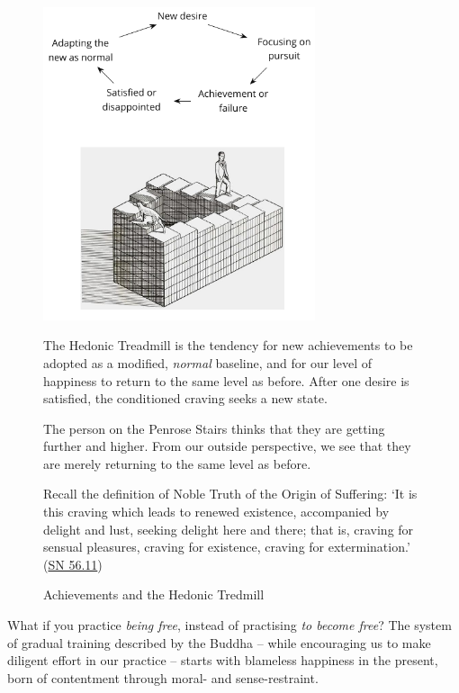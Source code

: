 \begin{figure}[h]
\caption{Achievements and the Hedonic Tredmill}\label{fig-hedonic-treadmill}

\centering

\includegraphics[width=80mm]{./manuscript/tex/diagrams/hedonic-treadmill-stairs.pdf}

\bigskip

{\small

The Hedonic Treadmill is the tendency for new achievements to be adopted as a modified, \emph{normal} baseline,
and for our level of happiness to return to the same level as before.
After one desire is satisfied, the conditioned craving seeks a new state.

\bigskip

The person on the Penrose Stairs thinks that
they are getting further and higher.
From our outside perspective,
we see that they are merely returning to the same level as before.

\bigskip

Recall the definition of Noble Truth of the Origin of Suffering:
`It is this craving which leads to renewed existence,
 accompanied by delight and lust, seeking delight here and there;
 that is, craving for sensual pleasures, craving for existence,
 craving for extermination.'
(\href{https://suttacentral.net/sn56.11/en/bodhi}{SN 56.11})

}

\end{figure}

\clearpage

What if you practice \emph{being free}, instead of practising \emph{to
become free}? The system of gradual training described by the Buddha --
while encouraging us to make diligent effort in our practice -- starts
with blameless happiness in the present, born of contentment through
moral- and sense-restraint.

